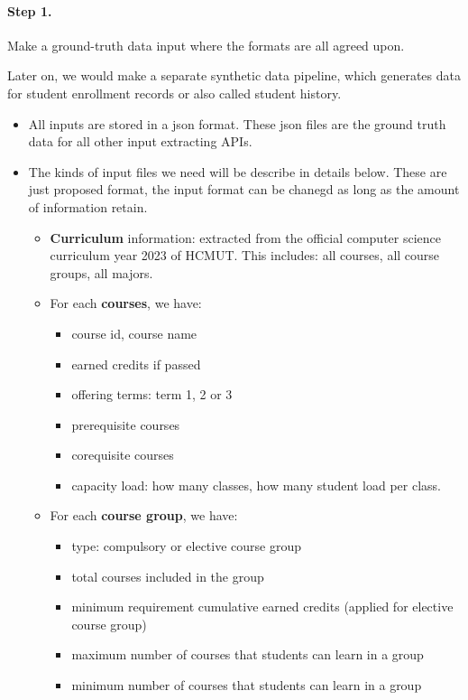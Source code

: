\documentclass[10pt,a4paper]{article}
\begin{document}
\paragraph{Step 1.} Make a ground-truth data input where the formats are all agreed upon.

Later on, we would make a separate synthetic data pipeline, which generates data for student enrollment records or also called student history.

\begin{itemize}
    \item All inputs are stored in a json format. These json files are the ground truth data for all other input extracting APIs.

    \item The kinds of input files we need will be describe in details below. These are just proposed format, the input format can be chanegd as long as the amount of information retain.
    \begin{itemize}
        \item \textbf{Curriculum} information: extracted from the official computer science curriculum year 2023 of HCMUT. This includes: all courses, all course groups, all majors.
        \item For each \textbf{courses}, we have:
        \begin{itemize}
            \item course id, course name
            \item earned credits if passed
            \item offering terms: term 1, 2 or 3
            \item prerequisite courses
            \item corequisite courses
            \item capacity load: how many classes, how many student load per class.
        \end{itemize}
        \item For each \textbf{course group}, we have:
        \begin{itemize}
            \item type: compulsory or elective course group
            \item total courses included in the group
            \item minimum requirement cumulative earned credits (applied for elective course group)
            \item maximum number of courses that students can learn in a group
            \item minimum number of courses that students can learn in a group
        \end{itemize}


\end{itemize}
\end{itemize}
\end{document}

